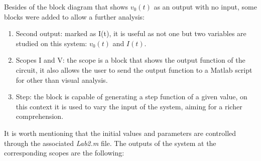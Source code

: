 \documentclass[a4paper,12pt]{article}
\begin{document}
\vspace{0.5cm}

Besides of the block diagram that shows $v_0(t)$ as an output with no input, some blocks were added to allow a further analysis:

\begin{enumerate}
    \item Second output: marked as I(t), it is useful as not one but two variables are studied on this system: $v_0(t)$ and $I(t)$.

    \item Scopes I and V: the scope is a block that shows the output function of the circuit, it also allows the user to send the output function to a Matlab script for other than visual analysis.

    \item Step: the block is capable of generating a step function of a given value, on this context it is used to vary the input of the system, aiming for a richer comprehension.
\end{enumerate}

It is worth mentioning that the initial values and parameters are controlled through the associated \textit{Lab2.m} file. The outputs of the system at the corresponding scopes are the following:

\vspace{0.5cm}
\end{document}
